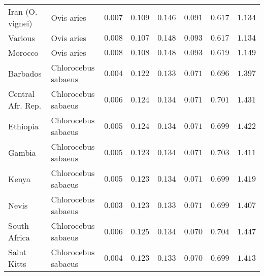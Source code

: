 \documentclass[12pt]{article}
\begin{document}
\begin{center}
\begin{longtable*}{|l|l|r|r|r|r|r|r|}
            Iran (O. vignei) &          Ovis aries &               $ 0.007$ &                    $ 0.109$ &  $ 0.146$ &            $ 0.091$ &                $ 0.617$ &           $ 1.134$ \\
            Various &          Ovis aries &               $ 0.008$ &                    $ 0.107$ &  $ 0.148$ &            $ 0.093$ &                $ 0.617$ &           $ 1.134$ \\
            Morocco &          Ovis aries &               $ 0.008$ &                    $ 0.108$ &  $ 0.148$ &            $ 0.093$ &                $ 0.619$ &           $ 1.149$ \\
             Barbados & Chlorocebus sabaeus &               $ 0.004$ &                    $ 0.122$ &  $ 0.133$ &            $ 0.071$ &                $ 0.696$ &           $ 1.397$ \\
             Central Afr. Rep. & Chlorocebus sabaeus &               $ 0.006$ &                    $ 0.124$ &  $ 0.134$ &            $ 0.071$ &                $ 0.701$ &           $ 1.431$ \\
             Ethiopia & Chlorocebus sabaeus &               $ 0.005$ &                    $ 0.124$ &  $ 0.134$ &            $ 0.071$ &                $ 0.699$ &           $ 1.422$ \\
             Gambia & Chlorocebus sabaeus &               $ 0.005$ &                    $ 0.123$ &  $ 0.134$ &            $ 0.071$ &                $ 0.703$ &           $ 1.411$ \\
             Kenya & Chlorocebus sabaeus &               $ 0.005$ &                    $ 0.123$ &  $ 0.134$ &            $ 0.071$ &                $ 0.699$ &           $ 1.419$ \\
             Nevis & Chlorocebus sabaeus &               $ 0.003$ &                    $ 0.123$ &  $ 0.133$ &            $ 0.071$ &                $ 0.699$ &           $ 1.407$ \\
             South Africa  & Chlorocebus sabaeus &               $ 0.006$ &                    $ 0.125$ &  $ 0.134$ &            $ 0.070$ &                $ 0.704$ &           $ 1.447$ \\
             Saint Kitts & Chlorocebus sabaeus &               $ 0.004$ &                    $ 0.123$ &  $ 0.133$ &            $ 0.070$ &                $ 0.699$ &           $ 1.413$ \\

\end{longtable*}
\end{center}
\end{document}
